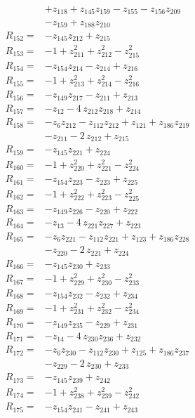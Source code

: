 \begin{align*}
&+z_{118} +z_{145}z_{159} -z_{155} -z_{156}z_{209}\\
&-z_{159} +z_{188}z_{210}\\[2pt]
R_{152}={}&-z_{145}z_{212} +z_{215}\\[2pt]
R_{153}={}&-1 +z_{211}^{2} +z_{212}^{2} -z_{215}^{2}\\[2pt]
R_{154}={}&-z_{154}z_{214} -z_{214} +z_{216}\\[2pt]
R_{155}={}&-1 +z_{213}^{2} +z_{214}^{2} -z_{216}^{2}\\[2pt]
R_{156}={}&-z_{149}z_{217} -z_{211} +z_{213}\\[2pt]
R_{157}={}&-z_{12} -4\,z_{212}z_{218} +z_{214}\\[2pt]
R_{158}={}&-z_{6}z_{212} -z_{112}z_{212} +z_{121} +z_{186}z_{219}\\
&-z_{211} -2\,z_{212} +z_{215}\\[2pt]
R_{159}={}&-z_{145}z_{221} +z_{224}\\[2pt]
R_{160}={}&-1 +z_{220}^{2} +z_{221}^{2} -z_{224}^{2}\\[2pt]
R_{161}={}&-z_{154}z_{223} -z_{223} +z_{225}\\[2pt]
R_{162}={}&-1 +z_{222}^{2} +z_{223}^{2} -z_{225}^{2}\\[2pt]
R_{163}={}&-z_{149}z_{226} -z_{220} +z_{222}\\[2pt]
R_{164}={}&-z_{13} -4\,z_{221}z_{227} +z_{223}\\[2pt]
R_{165}={}&-z_{6}z_{221} -z_{112}z_{221} +z_{123} +z_{186}z_{228}\\
&-z_{220} -2\,z_{221} +z_{224}\\[2pt]
R_{166}={}&-z_{145}z_{230} +z_{233}\\[2pt]
R_{167}={}&-1 +z_{229}^{2} +z_{230}^{2} -z_{233}^{2}\\[2pt]
R_{168}={}&-z_{154}z_{232} -z_{232} +z_{234}\\[2pt]
R_{169}={}&-1 +z_{231}^{2} +z_{232}^{2} -z_{234}^{2}\\[2pt]
R_{170}={}&-z_{149}z_{235} -z_{229} +z_{231}\\[2pt]
R_{171}={}&-z_{14} -4\,z_{230}z_{236} +z_{232}\\[2pt]
R_{172}={}&-z_{6}z_{230} -z_{112}z_{230} +z_{125} +z_{186}z_{237}\\
&-z_{229} -2\,z_{230} +z_{233}\\[2pt]
R_{173}={}&-z_{145}z_{239} +z_{242}\\[2pt]
R_{174}={}&-1 +z_{238}^{2} +z_{239}^{2} -z_{242}^{2}\\[2pt]
R_{175}={}&-z_{154}z_{241} -z_{241} +z_{243}\\[2pt]

\end{align*}
